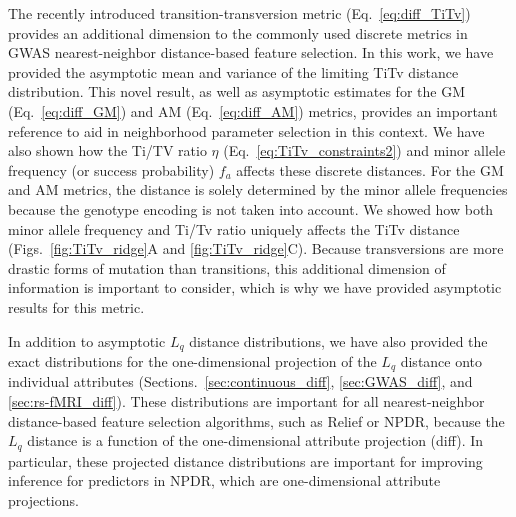 \documentclass[10pt,letterpaper]{article}
\begin{document}
The recently introduced transition-transversion metric (Eq.~\ref{eq:diff_TiTv}) provides an additional dimension to the commonly used discrete metrics in GWAS nearest-neighbor distance-based feature selection. In this work, we have provided the asymptotic mean and variance of the limiting TiTv distance distribution. This novel result, as well as asymptotic estimates for the GM (Eq.~\ref{eq:diff_GM}) and AM (Eq.~\ref{eq:diff_AM}) metrics, provides an important reference to aid in neighborhood parameter selection in this context. We have also shown how the Ti/TV ratio $\eta$ (Eq.~\ref{eq:TiTv_constraints2}) and minor allele frequency (or success probability) $f_a$ affects these discrete distances. For the GM and AM metrics, the distance is solely determined by the minor allele frequencies because the genotype encoding is not taken into account. We showed how both minor allele frequency and Ti/Tv ratio uniquely affects the TiTv distance (Figs.~\ref{fig:TiTv_ridge}A and \ref{fig:TiTv_ridge}C). Because transversions are more drastic forms of mutation than transitions, this additional dimension of information is important to consider, which is why we have provided asymptotic results for this metric.

In addition to asymptotic $L_q$ distance distributions, we have also provided the exact distributions for the one-dimensional projection of the $L_q$ distance onto individual attributes (Sections.~\ref{sec:continuous_diff}, \ref{sec:GWAS_diff}, and \ref{sec:rs-fMRI_diff}). These distributions are important for all nearest-neighbor distance-based feature selection algorithms, such as Relief or NPDR, because the $L_q$ distance is a function of the one-dimensional attribute projection (diff). In particular, these projected distance distributions are important for improving inference for predictors in NPDR, which are one-dimensional attribute projections.
\end{document}
